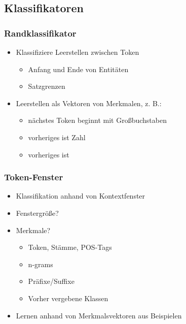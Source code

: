 \documentclass[nonacm=true, language=german]{acmart}
\begin{document}
\subsection{Klassifikatoren}

\subsubsection{Randklassifikator}

\begin{itemize}
    \item Klassifiziere Leerstellen zwischen Token
    \begin{itemize}
        \item Anfang und Ende von Entitäten
        \item Satzgrenzen
    \end{itemize}
    
    \item Leerstellen als Vektoren von Merkmalen, z. B.:
    \begin{itemize}
        \item nächstes Token beginnt mit Großbuchstaben
        \item vorheriges ist Zahl
        \item vorheriges ist 
    \end{itemize}
\end{itemize}

\subsubsection{Token-Fenster}

\begin{itemize}
    \item Klassifikation anhand von Kontextfenster
    \item Fenstergröße?
    \item Merkmale?
    \begin{itemize}
        \item Token, Stämme, POS-Tags
        \item n-grams
        \item Präfixe/Suffixe
        \item Vorher vergebene Klassen
    \end{itemize}
    
    \item Lernen anhand von Merkmalsvektoren aus Beispielen
\end{itemize}
\end{document}
